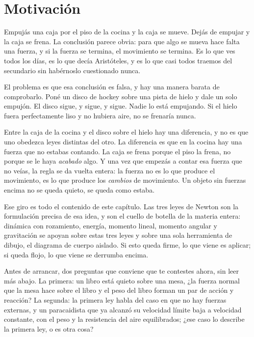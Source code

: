 \documentclass[11pt,openany]{book}
\begin{document}

\section{Motivación}

\begin{motivacion}
Empujás una caja por el piso de la cocina y la caja se mueve. Dejás de empujar y la caja se frena. La conclusión parece obvia: para que algo se mueva hace falta una fuerza, y si la fuerza se termina, el movimiento se termina. Es lo que ves todos los días, es lo que decía Aristóteles, y es lo que casi todos traemos del secundario sin habérnoslo cuestionado nunca.
\end{motivacion}

El problema es que esa conclusión es falsa, y hay una manera barata de comprobarlo. Poné un disco de hockey sobre una pista de hielo y dale un solo empujón. El disco sigue, y sigue, y sigue. Nadie lo está empujando. Si el hielo fuera perfectamente liso y no hubiera aire, no se frenaría nunca.

Entre la caja de la cocina y el disco sobre el hielo hay una diferencia, y no es que uno obedezca leyes distintas del otro. La diferencia es que en la cocina hay una fuerza que no estabas contando. La caja se frena porque el piso la frena, no porque se le haya \emph{acabado} algo. Y una vez que empezás a contar esa fuerza que no veías, la regla se da vuelta entera: la fuerza no es lo que produce el movimiento, es lo que produce los \emph{cambios} de movimiento. Un objeto sin fuerzas encima no se queda quieto, se queda como estaba.

Ese giro es todo el contenido de este capítulo. Las tres leyes de Newton son la formulación precisa de esa idea, y son el cuello de botella de la materia entera: dinámica con rozamiento, energía, momento lineal, momento angular y gravitación se apoyan sobre estas tres leyes y sobre una sola herramienta de dibujo, el diagrama de cuerpo aislado. Si esto queda firme, lo que viene es aplicar; si queda flojo, lo que viene se derrumba encima.

Antes de arrancar, dos preguntas que conviene que te contestes ahora, sin leer más abajo. La primera: un libro está quieto sobre una mesa, ¿la fuerza normal que la mesa hace sobre el libro y el peso del libro forman un par de acción y reacción? La segunda: la primera ley habla del caso en que no hay fuerzas externas, y un paracaidista que ya alcanzó su velocidad límite baja a velocidad constante, con el peso y la resistencia del aire equilibrados; ¿ese caso lo describe la primera ley, o es otra cosa?
\end{document}
